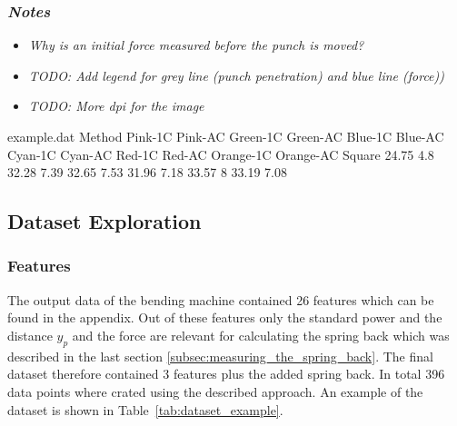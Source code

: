 \subsubsection*{\textit{Notes}}
\begin{itemize}
    \item \textit{Why is an initial force measured before the punch is moved?}
    \item \textit{TODO: Add legend for grey line (punch penetration) and blue line (force))}
    \item \textit{TODO: More dpi for the image}
\end{itemize}


\begin{filecontents*}{example.dat}
    Method Pink-1C Pink-AC Green-1C Green-AC Blue-1C Blue-AC Cyan-1C Cyan-AC Red-1C Red-AC
    Orange-1C Orange-AC
    Square 24.75 4.8 32.28 7.39 32.65 7.53 31.96 7.18 33.57 8 33.19 7.08
\end{filecontents*}


\label{sec:dataset_exploration}

\subsection{Dataset Exploration}\label{subsec:dataset-exploration}

\subsubsection{Features}
The output data of the bending machine contained 26 features which can be found in the appendix.
Out of these
features only the standard power and the distance $y_p$ and the force are relevant for
calculating the spring back
which was described in the last section \ref{subsec:measuring_the_spring_back}.
The final dataset therefore contained 3 features plus the added spring back.
In total 396 data points where crated using the described approach.
An example of the dataset is shown in Table~\ref{tab:dataset_example}.

